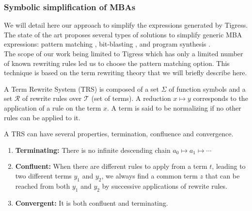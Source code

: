 \documentclass{projectreport}
\begin{document}
\subsubsection{Symbolic simplification of MBAs}

We will detail here our approach to simplify the expressions generated by Tigress. The state of the art proposes several types of solutions to simplify generic \textsf{MBA} expressions: pattern matching \cite{eyrolles}, bit-blasting \cite{Guinet2016AryboMC}, and program synthesis \cite{syntia}. \\
The scope of our work being limited to Tigress which has only a limited number of known rewriting rules led us to choose the pattern matching option.  This technique is based on the term rewriting theory that we will briefly describe here.

\begin{definition}
A Term Rewrite System (\textsf{TRS}) \cite{termrewriting} is composed of a set $\Sigma$ of function symbols and a set $\mathcal{R}$ of rewrite rules over $\mathcal{T}$ (set of terms). A reduction $x \mapsto y$ corresponds to the application of a rule on the term $x$. A term is said to be normalizing if no other rules can be applied to it.

\end{definition}
\begin{definition}
A \textsf{TRS} can have several properties, termination, confluence and convergence.
\begin{enumerate}
    \item \textbf{Terminating: } There is no infinite descending chain $a_0 \mapsto a_1 \mapsto \cdots$
    \item \textbf{Confluent: } When there are different rules to apply from a term $t$, leading to two different terms $y_1$ and $y_2$, we always find a common term $z$ that can be reached from both $y_1$ and $y_2$ by successive applications of rewrite rules.
    \item \textbf{Convergent: } It is both confluent and terminating.
\end{enumerate}
\end{definition}
\end{document}
